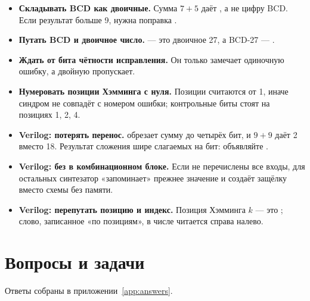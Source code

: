 \begin{warnbox}
\begin{itemize}
  \item \textbf{Складывать BCD как двоичные.} Сумма $7+5$ даёт , а не
    цифру BCD. Если результат больше 9, нужна поправка .
  \item \textbf{Путать BCD и двоичное число.}  --- это двоичное 27,
    а BCD-27 --- .
  \item \textbf{Ждать от бита чётности исправления.} Он только замечает
    одиночную ошибку, а двойную пропускает.
  \item \textbf{Нумеровать позиции Хэмминга с нуля.} Позиции считаются от 1,
    иначе синдром не совпадёт с номером ошибки; контрольные биты стоят на
    позициях 1, 2, 4.
  \item \textbf{Verilog: потерять перенос.} 
    обрезает сумму до четырёх бит, и $9+9$ даёт 2 вместо 18. Результат сложения
    шире слагаемых на бит: объявляйте \code{[4:0]}.
  \item \textbf{Verilog:  без  в комбинационном блоке.}
    Если не перечислены все входы, для остальных синтезатор «запоминает» прежнее
    значение и создаёт защёлку вместо схемы без памяти.
  \item \textbf{Verilog: перепутать позицию и индекс.} Позиция Хэмминга $k$ ---
    это ; слово, записанное «по позициям», в числе читается
    справа налево.
\end{itemize}
\end{warnbox}

\section{Вопросы и задачи}
\label{sec:tasks-codes}

Ответы собраны в приложении~\ref{app:answers}.

